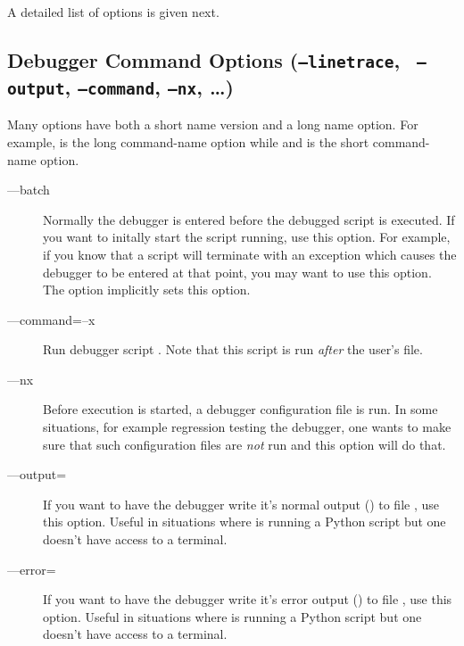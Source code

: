 A detailed list of options is given next.

\subsection{Debugger Command Options ({\tt --linetrace}, {\tt
    --output}, {\tt --command}, {\tt --nx}, \ldots)\label{subsection:command-options}}

Many options have both a short name version and a long name
option. For example,  is the long command-name option
while and  is the short command-name option.

\begin{description} 

\item[--{}--batch]

Normally the debugger is entered before the debugged script is
executed. If you want to initally start the script running, use this
option. For example, if you know that a script will terminate with an
exception which causes the debugger to be entered at that point, you
may want to use this option. The  option implicitly
sets this option.

\item[--{}--command=\code{\Large{|}}--x ]\label{switch:command}

Run debugger script . Note that this script is run
\emph{after} the user's  file.

\item[--{}--nx\code{\Large{|}}]\label{switch:nx}

Before execution is started, a debugger configuration file
 is run. In some situations, for example regression
testing the debugger, one wants to make sure that such configuration
files are \emph{not} run and this option will do that.

\item[--{}--output=]

If you want to have the debugger write it's normal output
() to file , use this option. Useful in
situations where is running a Python script but one doesn't have
access to a terminal.

\item[--{}--error=]

If you want to have the debugger write it's error output
() to file , use this option. Useful in
situations where is running a Python script but one doesn't have
access to a terminal.


\end{description}

